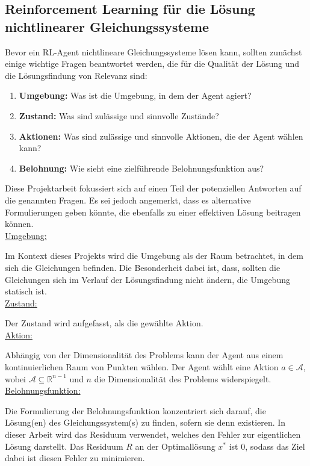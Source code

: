 \documentclass{article}
\theoremstyle{newline}
\begin{document}
\begin{onehalfspace}
\section{Reinforcement Learning für die Lösung nichtlinearer Gleichungssysteme}

Bevor ein RL-Agent nichtlineare Gleichungssysteme lösen kann, sollten zunächst einige wichtige Fragen beantwortet werden, die für die Qualität der Lösung und die Lösungsfindung von Relevanz sind:

\begin{enumerate}
	\item \textbf{Umgebung:} Was ist die Umgebung, in dem der Agent agiert?
	\item \textbf{Zustand:} Was sind zulässige und sinnvolle Zustände?
	\item \textbf{Aktionen:} Was sind zulässige und sinnvolle Aktionen, die der Agent wählen kann?
	\item \textbf{Belohnung:} Wie sieht eine zielführende Belohnungsfunktion aus?
\end{enumerate}

Diese Projektarbeit fokussiert sich auf einen Teil der potenziellen Antworten auf die genannten Fragen. Es sei jedoch angemerkt, dass es alternative Formulierungen geben könnte, die ebenfalls zu einer effektiven Lösung beitragen können.
\\

\underline{Umgebung:}
\smallskip

Im Kontext dieses Projekts wird die Umgebung als der Raum betrachtet, in dem sich die Gleichungen befinden. Die Besonderheit dabei ist, dass, sollten die Gleichungen sich im Verlauf der Lösungsfindung nicht ändern, die Umgebung statisch ist. 
\\

\underline{Zustand:}
\smallskip

Der Zustand wird aufgefasst, als die gewählte Aktion.
\\

\underline{Aktion:}
\smallskip

Abhängig von der Dimensionalität des Problems kann der Agent aus einem kontinuierlichen Raum von Punkten wählen. Der Agent wählt eine Aktion $a \in \mathcal{A}$, wobei $\mathcal{A} \subseteq \mathbb{R}^{n-1}$ und $n$ die Dimensionalität des Problems widerspiegelt.
\\
 
\underline{Belohnungsfunktion:}
\smallskip

Die Formulierung der Belohnungsfunktion konzentriert sich darauf, die Lösung(en) des Gleichungssystem(s) zu finden, sofern sie denn existieren. In dieser Arbeit wird das Residuum verwendet, welches den Fehler zur eigentlichen Lösung darstellt. Das Residuum $R$ an der Optimallösung $x^{\ast}$ ist $0$, sodass das Ziel dabei ist diesen Fehler zu minimieren. 


\end{onehalfspace}
\end{document}
